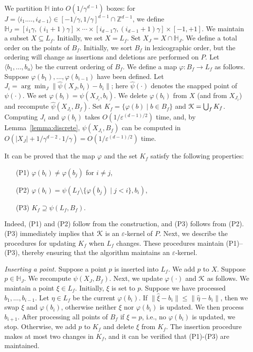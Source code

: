 \documentclass[11pt]{myclass}
\newcommand{\eps}{\varepsilon}
\renewcommand{\b}[1]{\ensuremath{\mathbb{#1}}}
\def\hcube{\mathbb{H}}
\def\kernel{\EuScript{K}}
\def\nbr{\psi}
\def\inbr{\varphi}
\begin{document}
We partition $\hcube$ into $O(1/\gamma^{d-1})$ boxes: for 
$J =\langle i_1.\ldots,i_{d-1}\rangle \in [-1/\gamma,1/\gamma]^{d-1} \cap \b{Z}^{d-1}$, 
we define
$\hcube_J = [i_1\gamma,(i_1+1)\gamma]\times \cdots \times [i_{d-1}\gamma,
(i_{d-1}+1)\gamma] \times [-1,+1]$. We maintain a subset
$X \subseteq L_f$. Initially, we set $X=L_f$. Set $X_J = X \cap \hcube_J$.
We define a total order on the points of $B_f$. Initially, we
sort $B_f$ in lexicographic order, but the ordering will change as 
insertions and deletions are performed on $P$.
Let $\langle b_1, \ldots, b_u\rangle$ be the current ordering of $B_f$. We 
define a map $\inbr: B_f \rightarrow L_f$ as follows. Suppose
$\inbr(b_1), \ldots, \inbr(b_{i-1})$ have been defined. Let 
$J_i = \arg\min_J \|\hat{\nbr}(X_J,b_i)-b_i\|$; here 
$\hat{\psi}(\cdot)$ denotes the snapped point of $\psi(\cdot)$. We set
$\inbr(b_i) = \nbr(X_{J_i},b_i)$. We delete $\inbr(b_i)$ from $X$ (and 
from $X_{J_i}$) and recompute $\hat{\nbr}(X_{J_i},B_f)$. Set $K_f = \{\inbr(b) 
\mid b \in B_f\}$ and $\kernel = \bigcup_f K_f$.
Computing $J_i$ and $\inbr(b_i)$ takes 
$O(1/\eps^{(d-1)/2})$ time, and, by Lemma~\ref{lemma:discrete}, 
$\nbr(X_{J_i},B_f)$ can be computed in $O(|X_J| + 1/\gamma^{d-2} \cdot 1/\gamma) = O(1/\eps^{(d-1)/2})$ time.

It can be proved that the map $\inbr$ and the set $K_f$ satisfy the following properties:
\begin{itemize} \denselist
\item[(P1)] $\inbr(b_i) \ne \inbr(b_j)$ for $i \ne j$,
\item[(P2)] $\inbr(b_i) = \nbr(L_f\setminus\{\inbr(b_j)\mid j < i\}, b_i)$,
\item[(P3)] $\displaystyle K_f \supseteq \nbr(L_f,B_f)$.
\end{itemize}
Indeed, (P1) and (P2) follow from the construction, and (P3) follows from
(P2). (P3) immediately implies that $\kernel$ is an $\eps$-kernel of $P$.
Next, we describe the procedures for updating $K_f$ when $L_f$
changes.  These procedures maintain (P1)--(P3), 
thereby ensuring that the algorithm maintains an $\eps$-kernel. 

\textit{Inserting a point.} 
Suppose a point $p$ is inserted into $L_f$. 
We add $p$ to $X$. Suppose $p \in \hcube_J$. We recompute $\nbr(X_J,B_f)$. Next, we update $\inbr(\cdot)$ and 
$\kernel$ as  follows. We maintain a point $\xi \in L_f$. Initially, 
$\xi$ is set to $p$.  Suppose we have processed 
$b_1, \ldots, b_{i-1}$. Let $\eta \in L_f$ be the 
current $\inbr(b_i)$. If $\|\hat{\xi}-b_i\| \le \|\hat{\eta}-b_i\|$, then we 
swap $\xi$ and $\inbr(b_i)$, otherwise neither $\xi$ nor $\inbr(b_i)$ is updated.
We then process $b_{i+1}$.  After processing all points of $B_f$ if $\xi=p$, 
i.e., no $\inbr(b_i)$ is updated, we stop. Otherwise, we add $p$ to $K_f$ and 
delete $\xi$ from $K_f$. 
The insertion procedure makes at most two changes in $K_f$, and it can be 
verified that (P1)-(P3) are maintained.
\end{document}
